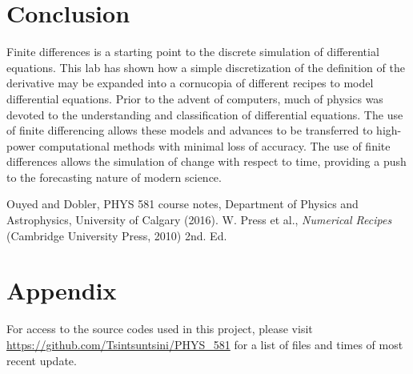 \documentclass[twocolumn]{article}
\begin{document}
\section{Conclusion}
Finite differences is a starting point to the discrete simulation of differential equations. This lab has shown how a simple discretization of the definition of the derivative may be expanded into a cornucopia of different recipes to model differential equations. Prior to the advent of computers, much of physics was devoted to the understanding and classification of differential equations. The use of finite differencing allows these models and advances to be transferred to high-power computational methods with minimal loss of accuracy. The use of finite differences allows the simulation of change with respect to time, providing a push to the forecasting nature of modern science.

\begin{thebibliography}{00}
	Ouyed and Dobler, PHYS 581 course notes, Department of Physics and Astrophysics, University of Calgary (2016).
	W. Press et al., \emph{Numerical Recipes} (Cambridge University Press, 2010) 2nd. Ed.
\end{thebibliography}

\section{Appendix}
For access to the source codes used in this project, please visit \url{https://github.com/Tsintsuntsini/PHYS_581} for a list of files and times of most recent update.
	
\end{document}
